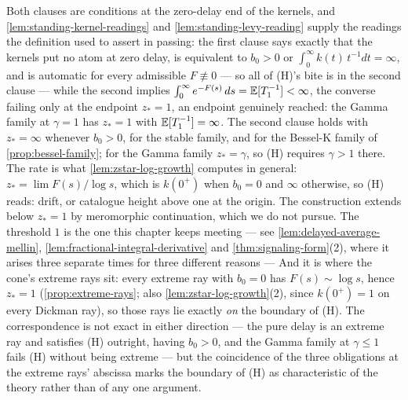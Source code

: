 Both clauses are conditions at the zero-delay end of the kernels, and
\ref{lem:standing-kernel-readings} and \ref{lem:standing-levy-reading} supply the readings the
definition used to assert in passing: the first clause says exactly that the kernels put no atom
at zero delay, is equivalent to $b_0 > 0$ or $\int_0^\infty k(t)\,t^{-1}dt = \infty$, and is
automatic for every admissible $F \not\equiv 0$ --- so all of (H)'s bite is in the second clause
--- while the second implies $\int_0^\infty e^{-F(s)}\,ds = \mathbb{E}[T_1^{-1}] < \infty$, the converse
failing only at the endpoint $z_* = 1$, an endpoint genuinely reached: the Gamma family at
$\gamma = 1$ has $z_* = 1$ with $\mathbb{E}[T_1^{-1}] = \infty$. The second clause holds with
$z_* = \infty$ whenever $b_0 > 0$, for the stable family, and for the Bessel-K family of
\ref{prop:bessel-family}; for the Gamma family $z_* = \gamma$, so (H) requires $\gamma > 1$
there. The rate is what \ref{lem:zstar-log-growth} computes in general: $z_* = \lim F(s)/\log s$,
which is $k(0^+)$ when $b_0 = 0$ and $\infty$ otherwise, so (H) reads: drift, or catalogue height
above one at the origin. The construction extends below $z_* = 1$ by meromorphic continuation,
which we do not pursue. The threshold $1$ is the one this chapter keeps meeting --- see
\ref{lem:delayed-average-mellin}, \ref{lem:fractional-integral-derivative} and
\ref{thm:signaling-form}(2), where it arises three separate times for three different reasons ---
And it is where the cone's extreme rays sit: every extreme ray with $b_0 = 0$ has
$F(s) \sim \log s$, hence $z_* = 1$ (\ref{prop:extreme-rays}; also \ref{lem:zstar-log-growth}(2),
since $k(0^+) = 1$ on every Dickman ray), so those rays lie exactly \emph{on} the boundary of (H).
The correspondence is not exact in either direction --- the pure delay is an extreme ray and
satisfies (H) outright, having $b_0 > 0$, and the Gamma family at $\gamma \le 1$ fails (H) without
being extreme --- but the coincidence of the three obligations at the extreme rays' abscissa marks
the boundary of (H) as characteristic of the theory rather than of any one argument.

